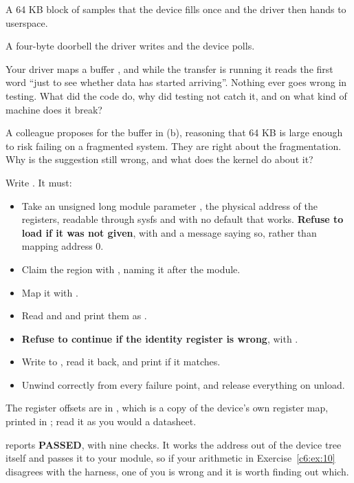  A 64 KB block of samples that the device fills once and the driver then hands to
userspace.

 A four-byte doorbell the driver writes and the device polls.

 Your driver maps a buffer , and while the transfer is running it
reads the first word ``just to see whether data has started arriving''. Nothing ever goes wrong in
testing. What did the code do, why did testing not catch it, and on what kind of machine does it
break?

 A colleague proposes  for the buffer in (b), reasoning
that 64 KB is large enough to risk  failing on a fragmented system. They are right
about the fragmentation. Why is the suggestion still wrong, and what does the kernel do about it?

\label{c6:ex:7}

Write . It must:
\begin{itemize}
  \item Take an unsigned long module parameter , the physical address of the registers,
    readable through sysfs and with no default that works. \textbf{Refuse to load if it was not
    given}, with  and a message saying so, rather than mapping address 0.
  \item Claim the region with , naming it after the module.
  \item Map it with .
  \item Read  and  and print them as .
  \item \textbf{Refuse to continue if the identity register is wrong}, with .
  \item Write  to , read it back, and print  if it matches.
  \item Unwind correctly from every failure point, and release everything on unload.
\end{itemize}
The register offsets are in , which is a copy of the device's own
register map, printed in ; read it as you would a datasheet.

\checkyourself {} reports \textbf{PASSED}, with nine checks. It works the
address out of the device tree itself and passes it to your module, so if your arithmetic in
Exercise~\ref{c6:ex:10} disagrees with the harness, one of you is wrong and it is worth finding out
which.

